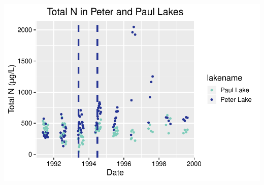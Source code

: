 \documentclass[]{article}
\begin{document}
\includegraphics{A08_TimeSeries_files/figure-latex/unnamed-chunk-6-1.pdf}
\end{document}
